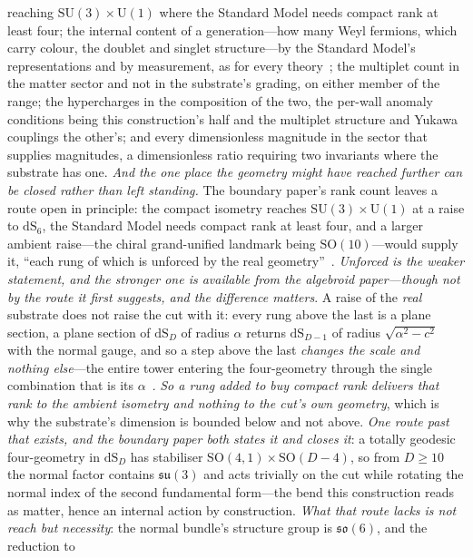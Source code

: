 \documentclass[11pt,a4paper]{article}
\theoremstyle{plain}
\theoremstyle{definition}
\theoremstyle{remark}
\begin{document}
\begin{enumerate}
reaching $\mathrm{SU}(3)\times\mathrm{U}(1)$ where the Standard Model needs compact rank at least four;
the internal content of a generation---how many Weyl fermions, which carry colour, the doublet and
singlet structure---by the Standard Model's representations and by measurement, as for every theory~\cite{JanzenMatter}; the multiplet count in the matter sector and not in the
substrate's grading, on either member of the range; the hypercharges in the composition of the two,
the per-wall anomaly conditions being this construction's half and the multiplet structure and Yukawa
couplings the other's; and every dimensionless magnitude in the sector that supplies magnitudes, a
dimensionless ratio requiring two invariants where the substrate has one.  \emph{And the one place the geometry might have reached further can be closed rather than left
standing.}  The boundary paper's rank count leaves a route open in principle: the compact isometry
reaches $\mathrm{SU}(3)\times\mathrm{U}(1)$ at a raise to $\mathrm{dS}_{6}$, the Standard Model needs compact
rank at least four, and a larger ambient raise---the chiral grand-unified landmark being
$\mathrm{SO}(10)$---would supply it, ``each rung of which is unforced by the real
geometry''~\cite{JanzenBoundary}.  \emph{Unforced is the weaker statement, and the stronger one is
available from the algebroid paper---though not by the route it first suggests, and the difference
matters}.  A raise of the \emph{real} substrate does not raise the cut with it: every rung above the
last is a plane section, a plane section of $\mathrm{dS}_{D}$ of radius $\alpha$ returns
$\mathrm{dS}_{D-1}$ of radius $\sqrt{\alpha^{2}-c^{2}}$ with the normal gauge, and so a step above the
last \emph{changes the scale and nothing else}---the entire tower entering the four-geometry through
the single combination that is its $\alpha$~\cite{JanzenAlgebroid}.  \emph{So a rung added to buy compact rank delivers that rank to the ambient isometry and nothing to
the cut's own geometry}, which is why the substrate's dimension is bounded below and not above.
\emph{One route past that exists, and the boundary paper both states it and closes it}: a totally
geodesic four-geometry in $\mathrm{dS}_{D}$ has stabiliser $\mathrm{SO}(4,1)\times\mathrm{SO}(D-4)$,
so from $D\ge10$ the normal factor contains $\mathfrak{su}(3)$ and acts trivially on the cut while
rotating the normal index of the second fundamental form---the bend this construction reads as
matter, hence an internal action by construction.  \emph{What that route lacks is not reach but
necessity}: the normal bundle's structure group is $\mathfrak{so}(6)$, and the reduction to

\end{enumerate}
\end{document}
